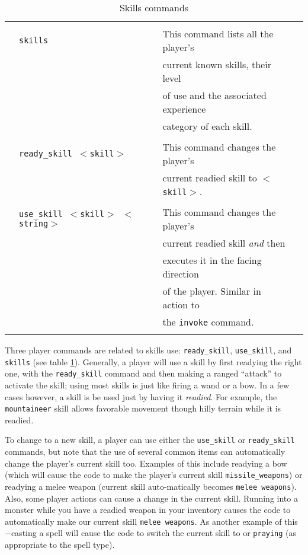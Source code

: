 \begin{table}
\small
\caption{Skills commands}\label{tab:skill_cmd}
\vskip 12pt
\begin{center}
\begin{tabular}{|cllc|} \hline 
 & & & \\
 & {\tt skills} & 	This command lists all the player's & \\ 
 &		& current known skills, their level & \\ 
 &		& of use and the associated experience & \\ 
 &		& category of each skill. & \\ 
 & & & \\ 
 & {\tt ready\_skill $<$skill$>$} 	& This command changes the player's & \\ 
  &				& current readied skill to {\tt $<$skill$>$}. &  \\ 
 & & & \\
 & {\tt use\_skill $<$skill$>$ $<$string$>$}  & This command changes the player's & \\ 
 &				& current readied skill {\em and} then & \\ 
  & 				& executes it in the facing direction & \\ 
 &				& of the player. Similar in action to & \\ 
 &				& the {\tt invoke} command. & \\ 
 & & & \\ \hline 
\end{tabular}
\end{center}
\end{table}
 
Three player commands are related to skills use: {\tt ready\_skill}, 
{\tt use\_skill}, and {\tt skills} (see table \ref{tab:skill_cmd}). 
Generally, a player will use a skill by first readying the right one,
with the {\tt ready\_skill} command and then making a ranged ``attack'' to
activate the skill; using most skills is just like firing a wand or a
bow.  In a few cases however, a skill is be used just by having it
{\em readied}. For example, the {\tt mountaineer} skill allows
favorable movement though hilly terrain while it is readied.
 
To change to a new skill, a player can use either the
{\tt use\_skill} or {\tt ready\_skill} commands, but note that the use of
several common items can automatically change the player's current
skill too. Examples of this include readying a bow (which will cause the
code to make the player's current skill {\tt missile\_weapons}) or readying
a melee weapon (current skill auto-matically becomes {\tt melee weapons}).
Also, some player actions can cause a change in the current skill.
Running into a monster while you have a readied weapon in your inventory
causes the code to automatically make our current skill {\tt melee weapons}.
As another example of this$-$casting a spell will cause the code to
switch the current skill to {\tt \spellcasting} or {\tt praying} (as appropriate
to the spell type).
 
